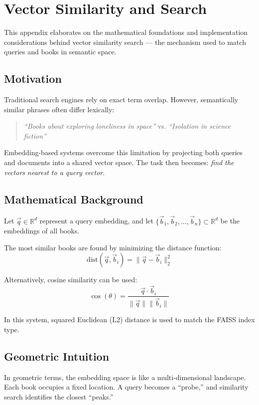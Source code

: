 \chapter{Vector Similarity and Search}
\label{appendix:similarity-theory}

This appendix elaborates on the mathematical foundations and implementation considerations behind vector similarity search — the mechanism used to match queries and books in semantic space.

\section{Motivation}
Traditional search engines rely on exact term overlap. However, semantically similar phrases often differ lexically:

\begin{quote}
\textit{``Books about exploring loneliness in space''} vs. \textit{``Isolation in science fiction''}
\end{quote}

Embedding-based systems overcome this limitation by projecting both queries and documents into a shared vector space. The task then becomes: \textit{find the vectors nearest to a query vector}.

\section{Mathematical Background}
Let \( \vec{q} \in \mathbb{R}^d \) represent a query embedding, and let \( \{ \vec{b}_1, \vec{b}_2, \dots, \vec{b}_n \} \subset \mathbb{R}^d \) be the embeddings of all books.

The most similar books are found by minimizing the distance function:
\[
\text{dist}(\vec{q}, \vec{b}_i) = \|\vec{q} - \vec{b}_i\|_2^2
\]

Alternatively, cosine similarity can be used:
\[
\cos(\theta) = \frac{\vec{q} \cdot \vec{b}_i}{\|\vec{q}\| \|\vec{b}_i\|}
\]

In this system, squared Euclidean (L2) distance is used to match the FAISS index type.

\section{Geometric Intuition}
In geometric terms, the embedding space is like a multi-dimensional landscape. Each book occupies a fixed location. A query becomes a “probe,” and similarity search identifies the closest “peaks.”

